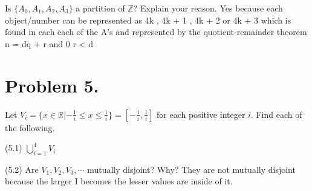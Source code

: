 \documentclass[11pt]{article}
\begin{document}
Is $\{A_0,A_1,A_2,A_3\}$ a partition of $\mathbb{Z}$? Explain your reason.
\newline
\newline
Yes because each object/number can be represented as 4k , 4k + 1 , 4k + 2 or 4k + 3 which is found in each each of the A’s and represented by the quotient-remainder theorem n = dq + r and 0 \leq r < d

\newpage

\section*{Problem 5.}

Let $V_i=\{x\in\mathbb{R}|-\frac{1}{i}\leq x \leq \frac{1}{i}\}=[-\frac{1}{i},\frac{1}{i}]$ for each positive integer $i$. Find each of the following.
\newline

\noindent
(5.1) $\bigcup\limits_{i=1}^{4}V_i$
\newline
\newline
[-1,1]
\noindent
\newline
\newline

\noindent
(5.2) Are $V_1,V_2,V_3,\cdots$ mutually disjoint? Why?
\newline
\newline
They are not mutually disjoint because the larger I becomes the lesser values are inside of it.
\noindent
\newline
\newline
\end{document}

